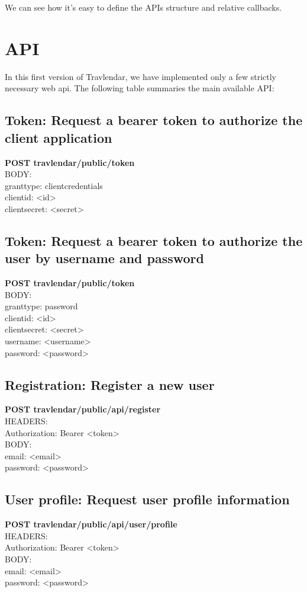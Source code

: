 We can see how it's easy to define the APIs structure and relative callbacks. 

\section{API}
In this first version of Travlendar, we have implemented only a few strictly necessary web api. The following table summaries the main available API:

\subsection{Token: Request a bearer token to authorize the client application}
\textbf{POST travlendar/public/token}\\
BODY:\\
grant\textunderscore type: client\textunderscore credentials\\
client\textunderscore id: <id>\\
client\textunderscore secret: <secret>\\

\subsection{Token: Request a bearer token to authorize the user by username and password}
\textbf{POST travlendar/public/token}\\
BODY:\\
grant\textunderscore type: password\\
client\textunderscore id: <id>\\
client\textunderscore secret: <secret>\\
username: <username>\\
password: <password>\\

\subsection{Registration: Register a new user}
\textbf{POST travlendar/public/api/register}\\
HEADERS:\\
Authorization: Bearer <token>\\
BODY:\\
email: <email>\\
password: <password>\\

\subsection{User profile: Request user profile information}
\textbf{POST travlendar/public/api/user/profile}\\
HEADERS:\\
Authorization: Bearer <token>\\
BODY:\\
email: <email>\\
password: <password>\\